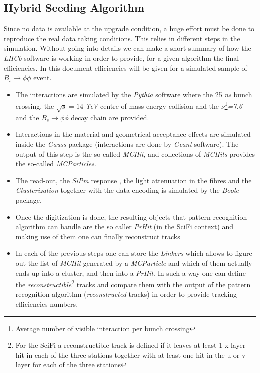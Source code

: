 \documentclass[paper=a4, fontsize=10pt]{scrartcl}
\numberwithin{equation}{section}		%
\numberwithin{figure}{section}			%
\numberwithin{table}{section}				%
\begin{document}
\subsection{Hybrid Seeding Algorithm}
Since no data is available at the upgrade condition, a huge effort must be done to reproduce the real data taking conditions. This relies in different steps in the simulation. Without going into details we can make a short summary of how the \textit{LHCb} software is working in order to provide, for a given algorithm the final efficiencies. In this document efficiencies will be given for a simulated sample of  $B_s\rightarrow \phi \phi$ event.
\begin{itemize}
\item{The interactions are simulated by the \textit{Pythia} software where the 25 \textit{ns} bunch crossing, the $\sqrt{s}= 14$ \textit{TeV} centre-of mass energy collision and the $\nu$\footnote{Average number of visible interaction per bunch crossing}\textit{=7.6} and the $B_s\rightarrow \phi \phi$ decay chain are provided.}
\item{Interactions in the material and geometrical acceptance effects are simulated inside the \textit{Gauss} package (interactions are done by \textit{Geant} software). The output of this step is the so-called \textit{MCHit}, and collections of \textit{MCHits} provides the so-called \textit{MCParticles}}.
\item{The read-out, the \textit{SiPm} response , the light attenuation in the fibres and the \textit{Clusterization} together with the data encoding is simulated by the \textit{Boole} package.}
\item{Once the digitization is done, the resulting objects that pattern recognition algorithm can handle are the so caller \textit{PrHit} (in the SciFi context) and making use of them one can finally reconstruct tracks}
\item{In each of the previous steps one can store the \textit{Linkers} which allows to figure out the list of \textit{MCHit} generated by a \textit{MCParticle} and which of them actually ends up into a cluster, and then into a \textit{PrHit}. 
In such a way one can define the \textit{reconstructible}\footnote{For the SciFi a reconstructible track is defined if it leaves at least 1 x-layer hit in each of the three stations together with at least one hit in the u or v layer for each of the three stations} tracks and compare them with the output of the pattern recognition algorithm (\textit{reconstructed} tracks) in order to provide tracking efficiencies numbers.}
\end{itemize}
\end{document}

